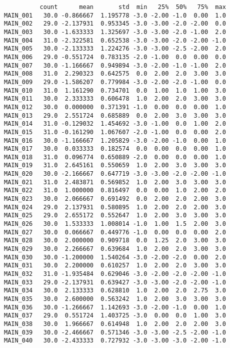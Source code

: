 \documentclass[a4paper,10pt,onecolumn,oneside,openright]{article}
\begin{document}
\begin{verbatim}
          count      mean       std  min   25%  50%   75%  max
MAIN_001   30.0 -0.866667  1.195778 -3.0 -2.00 -1.0  0.00  1.0
MAIN_002   29.0 -2.137931  0.953345 -3.0 -3.00 -2.0 -2.00  0.0
MAIN_003   30.0 -1.633333  1.325697 -3.0 -3.00 -2.0 -1.00  2.0
MAIN_004   31.0 -2.322581  0.652538 -3.0 -3.00 -2.0 -2.00 -1.0
MAIN_005   30.0 -2.133333  1.224276 -3.0 -3.00 -2.5 -2.00  2.0
MAIN_006   29.0 -0.551724  0.783135 -2.0 -1.00  0.0  0.00  0.0
MAIN_007   30.0 -1.166667  0.949894 -3.0 -2.00 -1.0 -1.00  2.0
MAIN_008   31.0  2.290323  0.642575  0.0  2.00  2.0  3.00  3.0
MAIN_009   29.0 -1.586207  0.779984 -3.0 -2.00 -2.0 -1.00  0.0
MAIN_010   31.0  1.161290  0.734701  0.0  1.00  1.0  1.00  3.0
MAIN_011   30.0  2.333333  0.606478  1.0  2.00  2.0  3.00  3.0
MAIN_012   30.0  0.000000  0.371391 -1.0  0.00  0.0  0.00  1.0
MAIN_013   29.0  2.551724  0.685889  0.0  2.00  3.0  3.00  3.0
MAIN_014   31.0 -0.129032  1.454692 -3.0 -1.00  0.0  1.00  2.0
MAIN_015   31.0 -0.161290  1.067607 -2.0 -1.00  0.0  0.00  2.0
MAIN_016   30.0 -1.166667  1.205829 -3.0 -2.00 -1.0  0.00  1.0
MAIN_017   30.0  0.033333  0.182574  0.0  0.00  0.0  0.00  1.0
MAIN_018   31.0  0.096774  0.650889 -2.0  0.00  0.0  0.00  1.0
MAIN_019   31.0  2.645161  0.550659  1.0  2.00  3.0  3.00  3.0
MAIN_020   30.0 -2.166667  0.647719 -3.0 -3.00 -2.0 -2.00 -1.0
MAIN_021   31.0  2.483871  0.569852  1.0  2.00  3.0  3.00  3.0
MAIN_022   31.0  1.000000  0.816497  0.0  0.00  1.0  2.00  2.0
MAIN_023   30.0  2.066667  0.691492  0.0  2.00  2.0  2.00  3.0
MAIN_024   29.0  2.137931  0.580895  1.0  2.00  2.0  2.00  3.0
MAIN_025   29.0  2.655172  0.552647  1.0  2.00  3.0  3.00  3.0
MAIN_026   30.0  1.533333  1.008014 -1.0  1.00  1.5  2.00  3.0
MAIN_027   30.0  0.066667  0.449776 -1.0  0.00  0.0  0.00  2.0
MAIN_028   30.0  2.000000  0.909718  0.0  1.25  2.0  3.00  3.0
MAIN_029   30.0  2.266667  0.639684  1.0  2.00  2.0  3.00  3.0
MAIN_030   30.0 -1.200000  1.540264 -3.0 -2.00 -2.0  0.00  2.0
MAIN_031   30.0  2.200000  0.610257  1.0  2.00  2.0  3.00  3.0
MAIN_032   31.0 -1.935484  0.629046 -3.0 -2.00 -2.0 -2.00 -1.0
MAIN_033   29.0 -2.137931  0.639427 -3.0 -3.00 -2.0 -2.00 -1.0
MAIN_034   30.0  2.133333  0.628810  1.0  2.00  2.0  2.75  3.0
MAIN_035   30.0  2.600000  0.563242  1.0  2.00  3.0  3.00  3.0
MAIN_036   30.0 -1.266667  1.142693 -3.0 -2.00 -1.0  0.00  1.0
MAIN_037   29.0  0.551724  1.403725 -3.0  0.00  0.0  1.00  3.0
MAIN_038   30.0  1.966667  0.614948  1.0  2.00  2.0  2.00  3.0
MAIN_039   30.0 -2.466667  0.571346 -3.0 -3.00 -2.5 -2.00 -1.0
MAIN_040   30.0 -2.433333  0.727932 -3.0 -3.00 -3.0 -2.00 -1.0

\end{verbatim}
\end{document}
